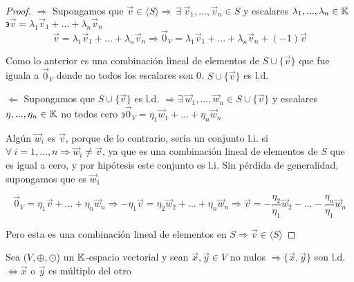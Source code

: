 \begin{proof}
    $\Rightarrow$ Supongamos que $\vec{v} \in \langle S \rangle \Rightarrow \:  \exists \: {\vec{v}}_{1}, ..., {\vec{v}}_{n} \in S$ y escalares $\lambda_1,...,\lambda_n \in \mathbb{K} $ $\backepsilon \vec{v} = {\lambda}_{1}{\vec{v}}_{1} + ...+ {\lambda}_{n} {\vec{v}}_{n}$
    \begin{equation*}
         \vec{v} = {\lambda}_{1}{\vec{v}}_{1} + ...+ {\lambda}_{n} {\vec{v}}_{n} \Rightarrow {\vec{0}}_{V} =  {\lambda}_{1}{\vec{v}}_{1} + ...+ {\lambda}_{n} {\vec{v}}_{n} + (-1)\vec{v} 
    \end{equation*}

    Como lo anterior es una combinación lineal de elementos de $S \cup \{ \vec{v} \}$ que fue iguala a $ {\vec{0}}_{V}$ donde no todos los escalares son 0. $S \cup \{ \vec{v} \}$ es l.d.

    $\Leftarrow$ Supongamos que $S \cup \{ \vec{v} \}$ es l.d. $\Rightarrow \exists \: {\vec{w}}_{1}, ..., {\vec{w}}_{n} \in S \cup \{ \vec{v} \}$ y escalares $\eta,...,\eta_n \in \mathbb{K} $ no todos cero $\backepsilon {\vec{0}}_{V}  = {\eta}_{1}{\vec{w}}_{1} + ...+ {\eta}_{n} {\vec{w}}_{n}$

    Algún $ {\vec{w}}_{i}$ es $\vec{v}$, porque de lo contrario, sería un conjunto l.i. si $\forall \: i = 1, ... , n \Rightarrow {\vec{w}}_{i} \neq \vec{v}$, ya que es una combinación lineal de elementos de $S$ que es igual a cero, y por hipótesis este conjunto es l.i.  Sin pérdida de generalidad, supongamos que es ${\vec{w}}_{1}$

    \begin{equation*}
        {\vec{0}}_{V}  = {\eta}_{1} \vec{v} + ...+ {\eta}_{n} {\vec{w}}_{n} \Rightarrow - {\eta}_{1} \vec{v} = {\eta}_{2}{\vec{w}}_{2} + ...+ {\eta}_{n} {\vec{w}}_{n} \Rightarrow \vec{v} = - \frac{{\eta}_{2}}{{\eta}_{1}}{\vec{w}}_{2} - ...- \frac{{\eta}_{n}}{{\eta}_{1}}{\vec{w}}_{n}
    \end{equation*}

    Pero esta es una combinación lineal de elementos en $S \Rightarrow \vec{v} \in \langle S \rangle$
\end{proof}

\begin{theorem} \label{teo11}
      Sea ($V, \oplus, \odot$) un $\mathbb{K}$-espacio vectorial y sean $\vec{x}, \vec{y} \in V$ no nulos $\Rightarrow \{ \vec{x}, \vec{y} \}$ son l.d. $\Leftrightarrow \vec{x}$ o $\vec{y}$ es múltiplo del otro
\end{theorem}

